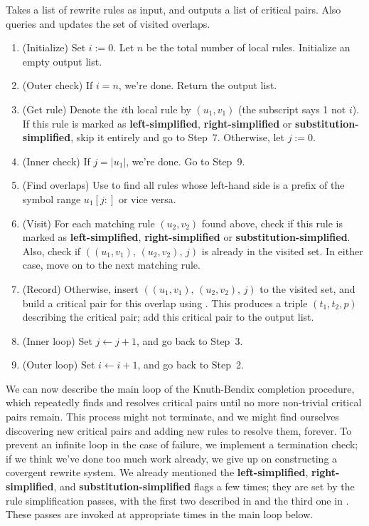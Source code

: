 \documentclass[../generics]{subfiles}
\begin{document}
\begin{algorithm}\label{find overlapping rule algo}
Takes a list of rewrite rules as input, and outputs a list of critical pairs. Also queries and updates the set of visited overlaps.
\begin{enumerate}
\item (Initialize) Set $i:=0$. Let $n$ be the total number of local rules. Initialize an empty output list.
\item (Outer check) If $i=n$, we're done. Return the output list.
\item (Get rule) Denote the $i$th local rule by $(u_1, v_1)$ (the subscript says 1 not $i$). If this rule is marked as \textbf{left-simplified}, \textbf{right-simplified} or \textbf{substitution-simplified}, skip it entirely and go to Step~7. Otherwise, let $j:=0$.
\item (Inner check) If $j=|u_1|$, we're done. Go to Step~9.
\item (Find overlaps) Use  to find all rules whose left-hand side is a prefix of the symbol range $u_1[j:]$ or vice versa.
\item (Visit) For each matching rule $(u_2, v_2)$ found above, check if this rule is marked as \textbf{left-simplified}, \textbf{right-simplified} or \textbf{substitution-simplified}. Also, check if $((u_1, v_1),\,(u_2, v_2),\,j)$ is already in the visited set. In either case, move on to the next matching rule.
\item (Record) Otherwise, insert $((u_1, v_1),\,(u_2, v_2),\,j)$ to the visited set, and build a critical pair for this overlap using . This produces a triple $(t_1, t_2, p)$ describing the critical pair; add this critical pair to the output list.
\item (Inner loop) Set $j\leftarrow j+1$, and go back to Step~3.
\item (Outer loop) Set $i\leftarrow i+1$, and go back to Step~2.
\end{enumerate}
\end{algorithm}

We can now describe the main loop of the Knuth-Bendix completion procedure, which repeatedly finds and resolves critical pairs until no more non-trivial critical pairs remain. This process might not terminate, and we might find ourselves discovering new critical pairs and adding new rules to resolve them, forever. To prevent an infinite loop in the case of failure, we implement a termination check; if we think we've done too much work already, we give up on constructing a covergent rewrite system. We already mentioned the \textbf{left-simplified}, \textbf{right-simplified}, and \textbf{substitution-simplified} flags a few times; they are set by the rule simplification passes, with the first two described in  and the third one in . These passes are invoked at appropriate times in the main loop below.
\end{document}
